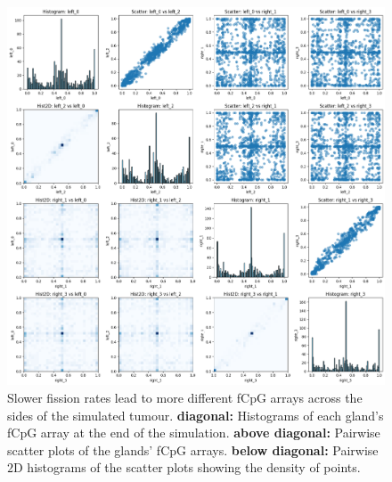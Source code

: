 \begin{figure}[h]
    \centering
    \includegraphics[width=\textwidth]{Chapter_4/figures/inter-gland-sens/slow-plot.png}
    \caption{Slower fission rates lead to more different fCpG arrays across the
    sides of the simulated tumour. \textbf{diagonal:} Histograms of each
    gland's fCpG array at the end of the simulation. \textbf{above diagonal:}
    Pairwise scatter plots of the glands' fCpG arrays. \textbf{below diagonal:}
    Pairwise $2$D histograms of the scatter plots showing the density of
    points.}
    \label{fig:inter-slow}
\end{figure}

